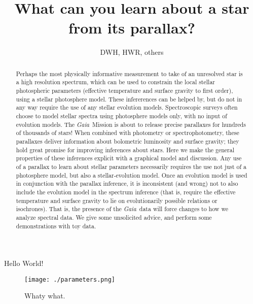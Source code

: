 \documentclass[12pt, preprint]{aastex}
\newcommand{\project}[1]{\textsl{#1}}
\newcommand{\gaia}{\project{Gaia}}
\begin{document}
\title{What can you learn about a star from its parallax?}
\author{DWH, HWR, others}

\begin{abstract}
Perhaps the most physically informative measurement to take of
an unresolved star is a high resolution spectrum, which can be used
to constrain the local stellar photospheric parameters (effective
temperature and surface gravity to first order), using a stellar
photosphere model.
These infererences can be helped by, but do not in any way require
the use of any stellar evolution models.
Spectroscopic surveys often choose to model stellar
spectra using photosphere models only, with no input of evolution
models.
The \gaia\ Mission is about to release precise parallaxes for hundreds
of thousands of stars!
When combined with photometry or spectrophotometry, these parallaxes
deliver information about bolometric luminosity and surface gravity;
they hold great promise for improving inferences about stars.
Here we make the general properties of these inferences explicit with
a graphical model and discussion.
Any use of a parallax
to learn about stellar parameters necessarily requires the use not
just of a photosphere model, but also a stellar-evolution
model.
Once an evolution model is used in conjunction with the parallax
inference, it is inconsistent (and wrong) not to also include the
evolution model in the spectrum inference (that is, require the
effective temperature and surface gravity to lie on evolutionarily
possible relations or isochrones).
That is, the presence of the \gaia\ data will force changes to how
we analyze spectral data.
We give some unsolicited advice, and perform some demonstrations with toy data.
\end{abstract}


Hello World!

\begin{figure}
\texttt{[image: ./parameters.png]}
\caption{Whaty what.\label{pgm}}
\end{figure}
\end{document}
